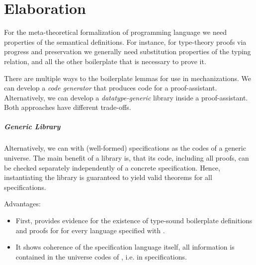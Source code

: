 \chapter{Elaboration}\label{ch:elaboration}
For the meta-theoretical formalization of programming language we need
properties of the semantical definitions. For instance, for type-theory proofs
via progress and preservation we generally need substitution properties of the
typing relation, and all the other boilerplate that is necessary to prove it.

There are multiple ways to the boilerplate lemmas for use in mechanizations. We
can develop a \emph{code generator} that produces code for a proof-assistant.
Alternatively, we can develop a \emph{datatype-generic} library inside a
proof-assistant. Both approaches have different trade-offs.


\paragraph{Generic Library}

Alternatively, we can with (well-formed) \Knot specifications as the codes of a
generic universe. The main benefit of a library is, that its code, including all
proofs, can be checked separately independently of a concrete specification.
Hence, instantiating the library is guaranteed to yield valid theorems for all
specifications.

Advantages:
\begin{itemize}
\item First, \Yarn provides evidence for the existence of type-sound boilerplate
  definitions and proofs for for every language specified with \Knot.
\item It shows coherence of the specification language itself, all information
  is contained in the universe codes of \Yarn, i.e. in \Knot specifications.
\end{itemize}

